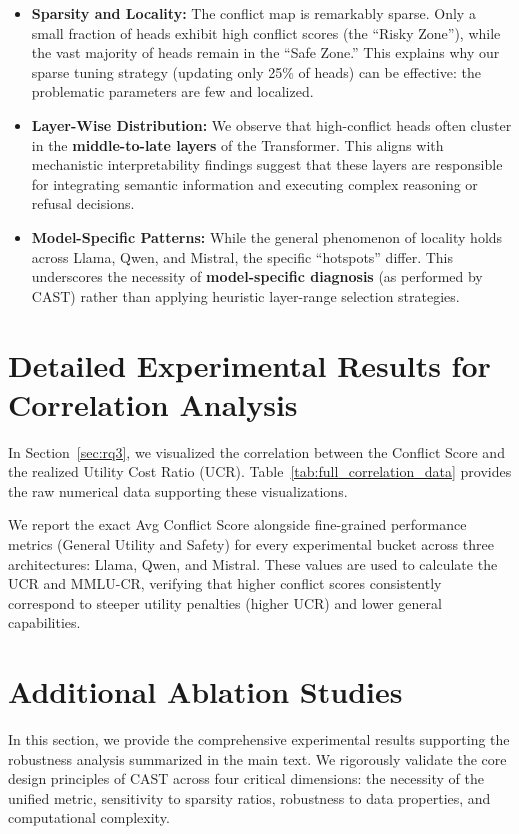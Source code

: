 \documentclass[11pt]{article}
\begin{document}
\begin{itemize}[leftmargin=*,itemsep=2pt, topsep=0pt, parsep=0pt]
    \item \textbf{Sparsity and Locality:} The conflict map is remarkably sparse. Only a small fraction of heads exhibit high conflict scores (the ``Risky Zone''), while the vast majority of heads remain in the ``Safe Zone.'' This explains why our sparse tuning strategy (updating only 25\% of heads) can be effective: the problematic parameters are few and localized.
    
    \item \textbf{Layer-Wise Distribution:} We observe that high-conflict heads often cluster in the \textbf{middle-to-late layers} of the Transformer. This aligns with mechanistic interpretability findings suggest that these layers are responsible for integrating semantic information and executing complex reasoning or refusal decisions.
    
    \item \textbf{Model-Specific Patterns:} While the general phenomenon of locality holds across Llama, Qwen, and Mistral, the specific ``hotspots'' differ. This underscores the necessity of \textbf{model-specific diagnosis} (as performed by CAST) rather than applying heuristic layer-range selection strategies.
\end{itemize}



\section{Detailed Experimental Results for Correlation Analysis}
\label{app:correlation_results}

In Section~\ref{sec:rq3}, we visualized the correlation between the Conflict Score and the realized Utility Cost Ratio (UCR). Table~\ref{tab:full_correlation_data} provides the raw numerical data supporting these visualizations. 

We report the exact Avg Conflict Score alongside fine-grained performance metrics (General Utility and Safety) for every experimental bucket across three architectures: Llama, Qwen, and Mistral. These values are used to calculate the UCR and MMLU-CR, verifying that higher conflict scores consistently correspond to steeper utility penalties (higher UCR) and lower general capabilities.





\section{Additional Ablation Studies}
\label{app:ablation}
In this section, we provide the comprehensive experimental results supporting the robustness analysis summarized in the main text. We rigorously validate the core design principles of CAST across four critical dimensions: the necessity of the unified metric, sensitivity to sparsity ratios, robustness to data properties, and computational complexity.
\end{document}
